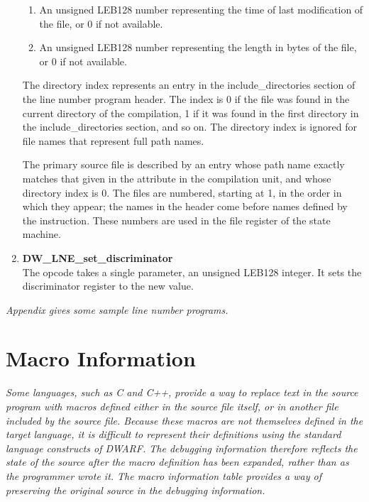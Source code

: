 \begin{enumerate}[1.]
\begin{enumerate}[1.]
\item An unsigned
LEB128 number representing the time of last modification
of the file, or 0 if not available.  

\item An unsigned LEB128
number representing the length in bytes of the file, or 0 if
not available.
\end{enumerate}

The directory index represents an entry in the
include\_directories section of the line number program
header. The index is 0 if the file was found in the current
directory of the compilation, 1 if it was found in the first
directory in the include\_directories section, and so on. The
directory index is ignored for file names that represent full
path names.

The primary source file is described by an entry whose path
name exactly matches that given in the  attribute
in the compilation unit, and whose directory index is 0. The
files are numbered, starting at 1, in the order in which they
appear; the names in the header come before names defined by
the  instruction. These numbers are used
in the file register of the state machine.

\item \textbf{DW\-\_LNE\-\_set\-\_discriminator} \\
The 
opcode takes a single
parameter, an unsigned LEB128 integer. It sets the
discriminator register to the new value.



\end{enumerate}

\textit{Appendix  
gives some sample line number programs.}

\section{Macro Information}
\label{chap:macroinformation}
\textit{Some languages, such as C and C++, provide a way to replace
text in the source program with macros defined either in the
source file itself, or in another file included by the source
file.  Because these macros are not themselves defined in the
target language, it is difficult to represent their definitions
using the standard language constructs of DWARF. The debugging
information therefore reflects the state of the source after
the macro definition has been expanded, rather than as the
programmer wrote it. The macro information table provides a way
of preserving the original source in the debugging information.}

